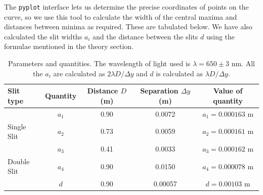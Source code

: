 \documentclass[11pt]{article}
\begin{document}
        The \texttt{pyplot} interface lets us determine the precise coordinates of points on the curve, so we use this tool to calculate the
        width of the central maxima and distances between minima as required. These are tabulated below.
        We have also calculated the slit widths $a_i$ and the distance between the slits $d$ using the formulae mentioned in the theory section.

        \begin{table}[H]
                \centering
                \caption{Parameters and quantities. The wavelength of light used is $\lambda = 650 \pm 3$ nm.
                All the $a_i$ are calculated as $2\lambda D/\Delta y$ and $d$ is calculated as $\lambda D /\Delta y$.}
                \label{tab:parameters}
                \begin{tabular}{l|c|c|c|c}\hline
                Slit type       & Quantity & Distance $D$ (m)    & Separation $\Delta y$ (m)    & Value of quantity     \\\hline\hline
                                & $a_1$    & 0.90                & 0.0072                       & $a_1 = 0.000163$ m    \\
                Single Slit     & $a_2$    & 0.73                & 0.0059                       & $a_2 = 0.000161$ m    \\
                                & $a_3$    & 0.41                & 0.0033                       & $a_3 = 0.000162$ m    \\\hline
                Double Slit     & $a_4$    & 0.90                & 0.0150                       & $a_4 = 0.000078$ m    \\
                                & $d$      & 0.90                & 0.00057                      & $d =   0.00103$ m\\\hline
                \end{tabular}
        \end{table}
        
        
\end{document}
